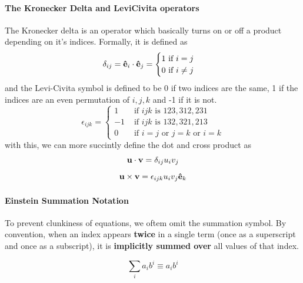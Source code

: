                 \paragraph{The Kronecker Delta and LeviCivita operators}
                The Kronecker delta is an operator which basically turns on or off a product depending on it's indices. Formally, it is defined as 
                \begin{equation}
					\delta_{ij}= \vu{e}_i \cdot \vu{e}_j =\begin{cases}
                        1\text{ if $i=j$}\\ 
                        0\text{ if $i\neq j$}
                    \end{cases}
                \end{equation} 
                and the Levi-Civita symbol is defined to be 0 if two indices are the same, 1 if the indices are an even permutation of $i,j,k$ and -1 if it is not. 
                \begin{equation}
                    \epsilon_{ijk}=\begin{cases}
                        1&\text{ if } ijk\text{ is }123, 312, 231\\
                        -1&\text{ if } ijk\text{ is }132, 321, 213\\
                        0&\text{ if $i=j$ or $j=k$ or $i=k$}
                    \end{cases}
                \end{equation}
                with this, we can more succintly define the dot and cross product as 
                \begin{equation}
                    \vb{u}\cdot\vb{v} = \delta_{ij}u_iv_j
                \end{equation}
                \begin{equation}
					\vb u \times \vb v = \epsilon_{ijk}  u_i v_j \vu{e}_k
                \end{equation}
				\paragraph{Einstein Summation Notation}
					To prevent clunkiness of equations, we oftem omit the summation symbol. By convention, 
					when an index appears \textbf{twice} in a single term (once as a superscript and once as a subscript), it is \textbf{implicitly summed over} all values of that index.

					\begin{equation}
						\sum_{i} a_i b^i \equiv a_i b^i
					\end{equation}


